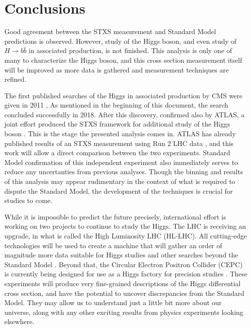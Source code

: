 \chapter{Conclusions} \label{ch:conclusion}

Good agreement between the STXS measurement and Standard Model predictions is observed.
However, study of the Higgs boson, and even study of $H\rightarrow b\bar{b}$ in
associated production, is not finished.
This analysis is only one of many to characterize the Higgs boson,
and this cross section measurement itself will be improved as more data is gathered
and measurement techniques are refined.

The first published searches of the Higgs in associated production by CMS
were given in 2011 \cite{CMS-PAS-HIG-11-012},
As mentioned in the beginning of this document, the search concluded successfully in 2018.
After this discovery, confirmed also by ATLAS,
a joint effort produced the STXS framework for additional study of the
Higgs boson \cite{berger2019simplified}.
This is the stage the presented analysis comes in.
ATLAS has already published results of an STXS measurement using
Run 2 LHC data \cite{Aaboud_2019},
and this work will allow a direct comparison between the two experiments.
Standard Model confirmation of this independent experiment also immediately serves to
reduce any uncertanties from previous analyses.
Though the binning and results of this analysis may appear rudimentary
in the context of what is required to dispute the Standard Model,
the development of the techniques is crucial for studies to come.

While it is impossible to predict the future precisely,
international effort is working on two projects to continue to study the Higgs.
The LHC is receiving an upgrade, in what is called the High Luminosity LHC (HL-LHC).
All cutting-edge technologies will be used to create a machine that will gather
an order of magnitude more data suitable for Higgs studies and
other searches beyond the Standard Model \cite{osti_1365580}.
Beyond that, the Circular Electron Positron Collider (CEPC) is currently being designed
for use as a Higgs factory for precision studies \cite{thecepcstudygroup2018cepc}.
These experiments will produce very fine-grained descriptions of
the Higgs differential cross section, and have the potential to uncover
discrepancies from the Standard Model.
They may allow us to understand just a little bit more about our universe,
along with any other exciting results from physics experiments looking elsewhere.
